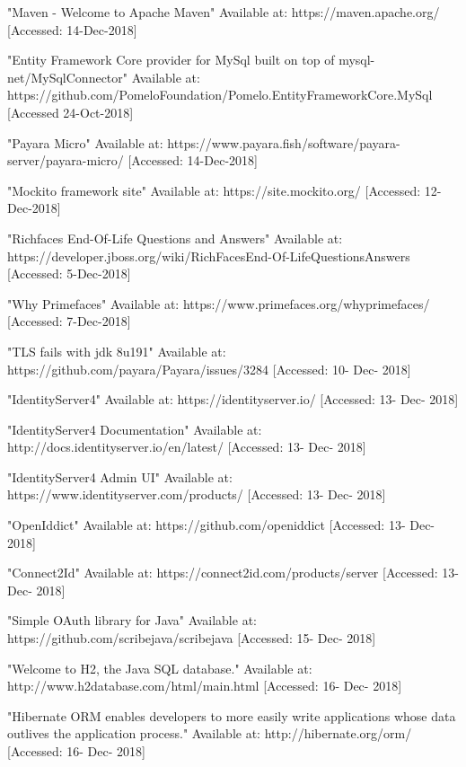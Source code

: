  "Maven - Welcome to Apache Maven"
Available at: https://maven.apache.org/ [Accessed: 14-Dec-2018]

 "Entity Framework Core provider for MySql built on top of mysql-net/MySqlConnector"
Available at: https://github.com/PomeloFoundation/Pomelo.EntityFrameworkCore.MySql
[Accessed 24-Oct-2018]

 "Payara Micro"
Available at: https://www.payara.fish/software/payara-server/payara-micro/ [Accessed: 14-Dec-2018]

 "Mockito framework site"
Available at: https://site.mockito.org/ [Accessed: 12-Dec-2018]

 "Richfaces End-Of-Life Questions and Answers"
Available at: https://developer.jboss.org/wiki/RichFacesEnd-Of-LifeQuestionsAnswers [Accessed: 5-Dec-2018]

 "Why Primefaces"
Available at: https://www.primefaces.org/whyprimefaces/ [Accessed: 7-Dec-2018]

 "TLS fails with jdk 8u191" Available at: https://github.com/payara/Payara/issues/3284 [Accessed: 10- Dec- 2018]

 "IdentityServer4" Available at: https://identityserver.io/ [Accessed: 13- Dec- 2018]

 "IdentityServer4 Documentation" Available at: http://docs.identityserver.io/en/latest/ [Accessed: 13- Dec- 2018]

 "IdentityServer4 Admin UI" Available at: https://www.identityserver.com/products/ [Accessed: 13- Dec- 2018]

 "OpenIddict" Available at: https://github.com/openiddict [Accessed: 13- Dec- 2018]

 "Connect2Id" Available at: https://connect2id.com/products/server [Accessed: 13- Dec- 2018]

 "Simple OAuth library for Java" Available at: https://github.com/scribejava/scribejava [Accessed: 15- Dec- 2018]

 "Welcome to H2, the Java SQL database." Available at: http://www.h2database.com/html/main.html [Accessed: 16- Dec- 2018]

 "Hibernate ORM enables developers to more easily write applications whose data outlives the application process." Available at: http://hibernate.org/orm/ [Accessed: 16- Dec- 2018]
